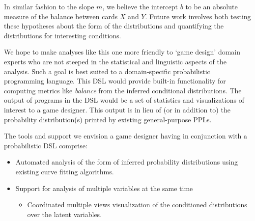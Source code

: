 In similar fashion to the slope $m$, we believe the intercept $b$ to be
an absolute measure of the balance between cards $X$ and $Y$.
Future work involves both testing these hypotheses about
the form of the distributions and quantifying the distributions
for interesting conditions.

We hope to make analyses like this one more friendly to `game design'
domain experts who are not steeped in the statistical and
linguistic aspects of the analysis. Such a goal is best suited to
a domain-specific probabilistic programming language. This DSL
would provide built-in functionality for computing metrics like
\emph{balance} from the inferred conditional distributions.
The output of programs in the DSL would be a set of statistics
and visualizations of interest to a game designer. This output
is in lieu of (or in addition to) the probability distribution(s)
printed by existing general-purpose PPLs.

The tools and support we envision a game designer having
in conjunction with a probabilistic DSL comprise:

\begin{itemize}
\item Automated analysis of the form of inferred probability distributions
      using existing curve fitting algorithms.
\item Support for analysis of multiple variables at the same time
      \begin{itemize}
      \item Coordinated multiple views visualization of the conditioned
            distributions over the latent variables.
      \end{itemize}
\end{itemize}


